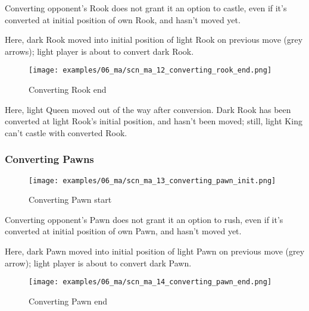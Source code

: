 Converting opponent's Rook does not grant it an option to castle, even if it's
converted at initial position of own Rook, and hasn't moved yet.

Here, dark Rook moved into initial position of light Rook on previous move
(grey arrows); light player is about to convert dark Rook.

\clearpage %

\noindent
\begin{figure}[!h]
\texttt{[image: examples/06\_ma/scn\_ma\_12\_converting\_rook\_end.png]}
\caption{Converting Rook end}
\label{fig:scn_ma_12_converting_rook_end}
\end{figure}

Here, light Queen moved out of the way after conversion. Dark Rook has been
converted at light Rook's initial position, and hasn't been moved; still,
light King can't castle with converted Rook.

\clearpage %

\subsubsection*{Converting Pawns}
\label{sec:Mayan Ascendancy/Pyramid/Conversion/Converting Pawns}

\vspace*{-1.1\baselineskip}
\noindent
\begin{figure}[!h]
\texttt{[image: examples/06\_ma/scn\_ma\_13\_converting\_pawn\_init.png]}
\caption{Converting Pawn start}
\label{fig:scn_ma_13_converting_pawn_init}
\end{figure}

Converting opponent's Pawn does not grant it an option to rush, even if it's
converted at initial position of own Pawn, and hasn't moved yet.

Here, dark Pawn moved into initial position of light Pawn on previous move
(grey arrow); light player is about to convert dark Pawn.

\clearpage %

\noindent
\begin{figure}[!h]
\texttt{[image: examples/06\_ma/scn\_ma\_14\_converting\_pawn\_end.png]}
\caption{Converting Pawn end}
\label{fig:scn_ma_14_converting_pawn_end}
\end{figure}

